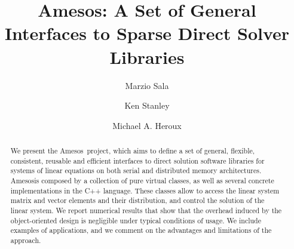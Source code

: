 \documentclass{llncs}
\newcommand{\amesos}{{\sc Amesos}}
\begin{document}
\pagestyle{headings} 
\mainmatter              %

\title{\amesos: A Set of General Interfaces to Sparse Direct Solver Libraries}
%
%
\author{Marzio Sala \and Ken Stanley \and
Michael A. Heroux}
%
%
%

\maketitle              %

\begin{abstract}
We present the \amesos\ project, which aims to define a set of general,
flexible, consistent, reusable and efficient interfaces to direct solution
software libraries for systems of linear equations on both serial and
distributed memory architectures. \amesos is composed by a collection of pure
virtual classes, as well as several concrete implementations in the C++
language. These classes allow to access the linear system matrix and vector
elements and their distribution, and control the solution of the linear
system. We report numerical results that show that the overhead induced by the
object-oriented design is negligible under typical conditions of usage. We
include examples of applications, and we comment on the advantages and
limitations of the approach.
\end{abstract}
\end{document}
